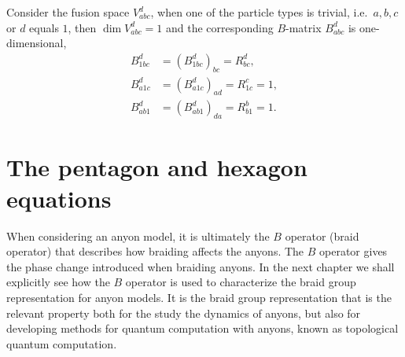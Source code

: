 \begin{lemma}\label{res:B1}
  Consider the fusion space $V_{abc}^d$, when one of the particle types is trivial, i.e.\ $a,b,c$ or $d$ equals $1$, then $\dim V_{abc}^d = 1$ and the corresponding $B$-matrix $B_{abc}^d$ is one-dimensional,
  \begin{equation}
    \begin{aligned}
      B_{1bc}^d &= \left( B_{1bc}^d \right)_{bc} = R_{bc}^d, \\
      B_{a1c}^d &= \left( B_{a1c}^d \right)_{ad} = R_{1c}^c = 1, \\
      B_{ab1}^d &= \left( B_{ab1}^d \right)_{da} = R_{b1}^b = 1.
    \end{aligned}
  \end{equation}
\end{lemma}















































\section{The pentagon and hexagon equations}\label{sec:pentagon hexagon}

When considering an anyon model, it is ultimately the $B$ operator (braid operator) that describes how braiding affects the anyons. The $B$ operator gives the phase change introduced when braiding anyons. In the next chapter we shall explicitly see how the $B$ operator is used to characterize the braid group representation for anyon models. It is the braid group representation that is the relevant property both for the study the dynamics of anyons, but also for developing methods for quantum computation with anyons, known as topological quantum computation.

